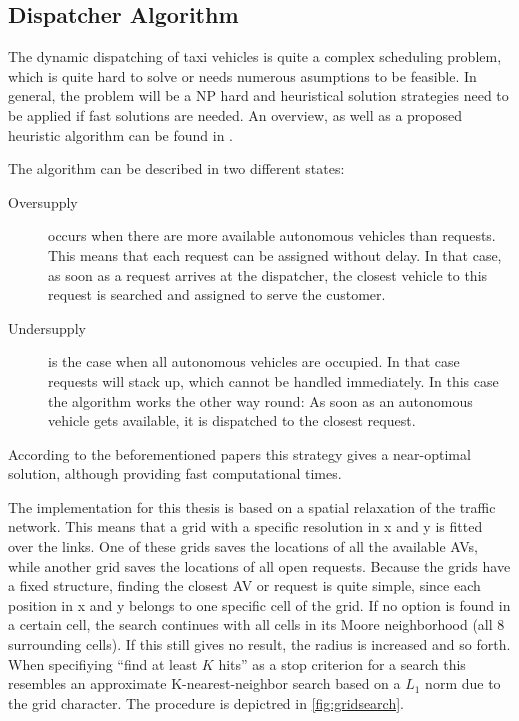 \subsection{Dispatcher Algorithm}

The dynamic dispatching of taxi vehicles is quite a complex scheduling problem,
which is quite hard to solve or needs numerous asumptions to be feasible. In
general, the problem will be a NP hard and heuristical solution strategies need
to be applied if fast solutions are needed. An overview, as well as a proposed
heuristic algorithm can be found in \citet{Maciejewski2015, Bischoff2016}.

The algorithm can be described in two different states:

\begin{description}
\item[Oversupply] occurs when there are more available autonomous vehicles than
requests. This means that each request can be assigned without delay. In that case,
as soon as a request arrives at the dispatcher, the closest vehicle to this request
is searched and assigned to serve the customer.
\item[Undersupply] is the case when all autonomous vehicles are occupied. In that
case requests will stack up, which cannot be handled immediately. In this case the
algorithm works the other way round: As soon as an autonomous vehicle gets available,
it is dispatched to the closest request.
\end{description}

According to the beforementioned papers this strategy gives a near-optimal solution,
although providing fast computational times.

The implementation for this thesis is based on a spatial relaxation of the traffic
network. This means that a grid with a specific resolution in x and y is fitted
over the links. One of these grids saves the locations of all the available AVs,
while another grid saves the locations of all open requests. Because the grids have
a fixed structure, finding the closest AV or request is quite simple, since each
position in x and y belongs to one specific cell of the grid. If no option is found
in a certain cell, the search continues with all cells in its Moore neighborhood
(all 8 surrounding cells). If this still gives no result, the radius is increased
and so forth. When specifiying ``find at least $K$ hits'' as a stop criterion for
a search this resembles an approximate K-nearest-neighbor search based on a $L_1$
norm due to the grid character.
The procedure is depictred in \cref{fig:gridsearch}.

